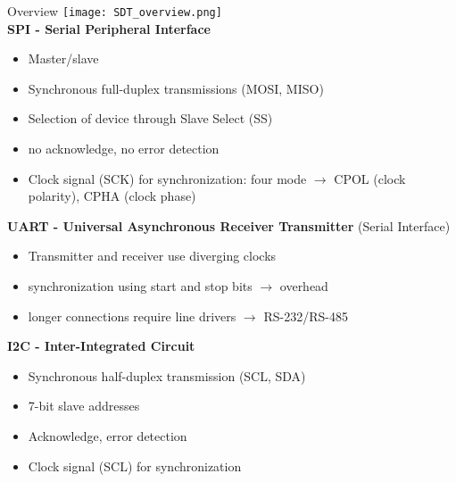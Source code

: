 \begin{concept}{Overview}
    \texttt{[image: SDT\_overview.png]}
    \vspace{2mm}\\
    \textbf{SPI - Serial Peripheral Interface}
    \begin{itemize}
        \item Master/slave
        \item Synchronous full-duplex transmissions (MOSI, MISO)
        \item Selection of device through Slave Select (SS)
        \item no acknowledge, no error detection
        \item Clock signal (SCK) for synchronization: four mode $\rightarrow$ CPOL (clock polarity), CPHA (clock phase)
    \end{itemize}
    \vspace{2mm}

    \textbf{UART - Universal Asynchronous Receiver Transmitter} (Serial Interface)
    \begin{itemize}
        \item Transmitter and receiver use diverging clocks
        \item synchronization using start and stop bits $\rightarrow$ overhead
        \item longer connections require line drivers $\rightarrow$ RS-232/RS-485
    \end{itemize}
    \vspace{2mm}

    \textbf{I2C - Inter-Integrated Circuit}
    \begin{itemize}
        \item Synchronous half-duplex transmission (SCL, SDA)
        \item 7-bit slave addresses
        \item Acknowledge, error detection
        \item Clock signal (SCL) for synchronization
    \end{itemize}
\end{concept}

